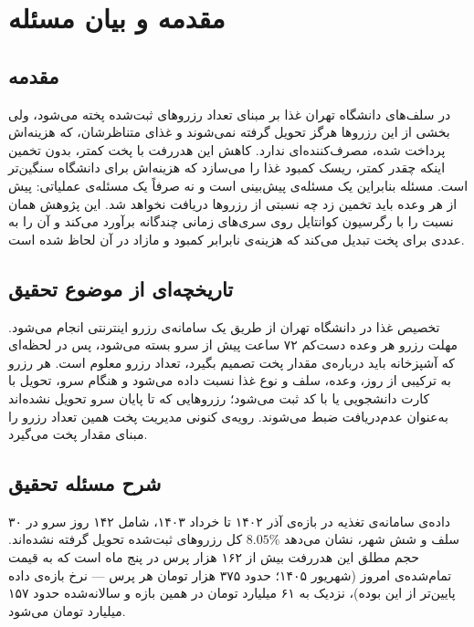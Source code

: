 
\chapter{مقدمه و بیان مسئله}

\section{مقدمه}
\label{sec:1-1}

در سلف‌های دانشگاه تهران غذا بر مبنای تعداد رزروهای ثبت‌شده پخته می‌شود، ولی بخشی از این
رزروها هرگز تحویل گرفته نمی‌شوند و غذای متناظرشان، که هزینه‌اش پرداخت شده، مصرف‌کننده‌ای
ندارد. کاهش این هدررفت با پخت کمتر، بدون تخمین اینکه چقدر کمتر، ریسک کمبود غذا را می‌سازد
که هزینه‌اش برای دانشگاه سنگین‌تر است. مسئله بنابراین یک مسئله‌ی پیش‌بینی است و نه صرفاً یک
مسئله‌ی عملیاتی: پیش از هر وعده باید تخمین زد چه نسبتی از رزروها دریافت نخواهد شد. این
پژوهش همان نسبت را با رگرسیون کوانتایل روی سری‌های زمانی چندگانه برآورد می‌کند و آن را به
عددی برای پخت تبدیل می‌کند که هزینه‌ی نابرابر کمبود و مازاد در آن لحاظ شده است.

\section{تاریخچه‌ای از موضوع تحقیق}
\label{sec:1-2}

تخصیص غذا در دانشگاه تهران از طریق یک سامانه‌ی رزرو اینترنتی انجام می‌شود. مهلت رزرو هر
وعده دست‌کم ۷۲ ساعت پیش از سرو بسته می‌شود، پس در لحظه‌ای که آشپزخانه باید درباره‌ی مقدار
پخت تصمیم بگیرد، تعداد رزرو معلوم است. هر رزرو به ترکیبی از روز، وعده، سلف و نوع غذا نسبت
داده می‌شود و هنگام سرو، تحویل با کارت دانشجویی یا با کد ثبت می‌شود؛ رزروهایی که تا پایان
سرو تحویل نشده‌اند به‌عنوان عدم‌دریافت ضبط می‌شوند. رویه‌ی کنونی مدیریت پخت همین تعداد رزرو
را مبنای مقدار پخت می‌گیرد.

\section{شرح مسئله تحقیق}
\label{sec:1-3}

داده‌ی سامانه‌ی تغذیه در بازه‌ی آذر ۱۴۰۲ تا خرداد ۱۴۰۳، شامل ۱۴۲ روز سرو در ۳۰ سلف و شش
شهر، نشان می‌دهد $8.05\%$ کل رزروهای ثبت‌شده تحویل گرفته نشده‌اند. حجم مطلق این هدررفت بیش
از ۱۶۲ هزار پرس در پنج ماه است که به قیمت تمام‌شده‌ی امروز (شهریور ۱۴۰۵؛ حدود ۳۷۵ هزار
تومان هر پرس — نرخ بازه‌ی داده پایین‌تر از این بوده)، نزدیک به ۶۱ میلیارد تومان در همین
بازه و سالانه‌شده حدود ۱۵۷ میلیارد تومان می‌شود.

